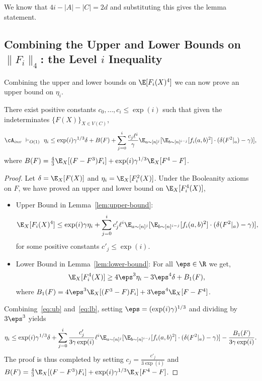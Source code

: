 We know that $4i - |A|-|C| = 2d$ and substituting this gives the lemma statement.




\subsection{Combining the Upper and Lower Bounds on $\|F_i\|_4$: the Level $i$ Inequality}
Combining the upper and lower bounds on $\E[F_i(X)^4]$ we can now prove an upper bound on $\eta_i$.

\begin{lemma}\label{lem:leveli-j}
There exist positive constants $c_0,\ldots,c_i \leq \exp(i)$ such that given the indeterminates $\{F(X)\}_{X \in V(C)}$,
\begin{align*}
\cA_{inv} \,\, \vdash_{O(1)}\,\, 
\eta_i \leq \exp(i)\gamma^{1/3}\delta + B(F) + \sum_{j = 0}^i  \frac{c_j\ell^{i}}{\gamma}\E_{a \sim [n]^{j}}[\E_{b \sim [n]^{i-j}}[f_i(a,b)^2]\cdot (\delta(F^{ 2}|_a) - \gamma)],
\end{align*}
where $B(F) =  \frac{4}{3}\E_X[(F - F^{ 3})F_i] + \exp(i)\gamma^{1/3}\E_X[F^{ 4} - F]$.
\end{lemma}

\begin{proof}
Let $\delta = \E_X[F(X)]$ and $\eta_i = \E_X[F_i^2(X)]$. Under the Booleanity axioms on $F$, we have proved an upper and lower bound on ${\E_X[F_i^4(X)]}$,
\begin{itemize}
    \item Upper Bound in Lemma~\ref{lem:upper-bound}:
\begin{equation}\label{eq:ub}
\E_X[F_i(X)^4] \leq \exp(i)\gamma \eta_i + \sum_{j = 0}^i c'_j \ell^{i}\E_{a \sim [n]^{j}}[\E_{b \sim [n]^{i-j}}[f_i(a,b)^2]\cdot (\delta(F^{2}|_a) - \gamma)],
\end{equation}
for some positive constants $c'_j \leq \exp(i)$.

\item Lower Bound in Lemma~\ref{lem:lower-bound}: For all $\eps \in \R$ we get,
\begin{equation}\label{eq:lb}
\E_X[F_i^4(X)] \geq 4\eps^3 \eta_i - 3\eps^4\delta + B_1(F),
\end{equation}
where $B_1(F) = 4\eps^3\E_X[(F^{ 3} - F)F_i]+3\eps^4 \E_X[F - F^{ 4}]$.
\end{itemize}

Combining~\eqref{eq:ub} and~\eqref{eq:lb}, 
setting $\eps = (\exp(i)\gamma)^{1/3}$ and dividing 
by $3\eps^3$ yields
\begin{align*}
\eta_i \leq \exp(i)\gamma^{1/3}\delta + \sum_{j = 0}^i \frac{c'_j}{3\gamma\exp(i)} \ell^{i}\E_{a \sim [n]^{j}}[\E_{b \sim [n]^{i-j}}[f_i(a,b)^2]\cdot (\delta(F^{ 2}|_a) - \gamma)] - \frac{B_1(F)}{3\gamma \exp(i)}.
\end{align*}
The proof is thus completed by setting $c_j = \frac{c'_j}{3\exp(i)}$ and 
$B(F) = \frac{4}{3}\E_X[(F - F^{ 3})F_i] + \exp(i)\gamma^{1/3}\E_X[F^{ 4} - F]$.
\end{proof}


